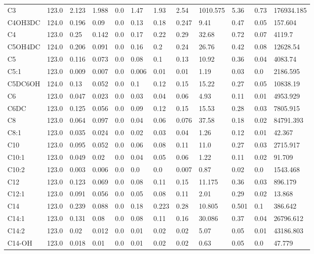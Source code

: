 \begin{tabular}{llllllllllll}
C3 & 123.0 & 2.123 & 1.988 & 0.0 & 1.47 & 1.93 & 2.54 & 1010.575 & 5.36 & 0.73 & 176934.185 \\
C4OH\C3DC & 124.0 & 0.196 & 0.09 & 0.0 & 0.13 & 0.18 & 0.247 & 9.41 & 0.47 & 0.05 & 157.604 \\
C4 & 123.0 & 0.25 & 0.142 & 0.0 & 0.17 & 0.22 & 0.29 & 32.68 & 0.72 & 0.07 & 4119.7 \\
C5OH\C4DC & 124.0 & 0.206 & 0.091 & 0.0 & 0.16 & 0.2 & 0.24 & 26.76 & 0.42 & 0.08 & 12628.54 \\
C5 & 123.0 & 0.116 & 0.073 & 0.0 & 0.08 & 0.1 & 0.13 & 10.92 & 0.36 & 0.04 & 4083.74 \\
C5:1 & 123.0 & 0.009 & 0.007 & 0.0 & 0.006 & 0.01 & 0.01 & 1.19 & 0.03 & 0.0 & 2186.595 \\
C5DC\C6OH & 124.0 & 0.13 & 0.052 & 0.0 & 0.1 & 0.12 & 0.15 & 15.22 & 0.27 & 0.05 & 10838.19 \\
C6 & 123.0 & 0.047 & 0.023 & 0.0 & 0.03 & 0.04 & 0.06 & 4.93 & 0.11 & 0.01 & 4953.929 \\
C6DC & 123.0 & 0.125 & 0.056 & 0.0 & 0.09 & 0.12 & 0.15 & 15.53 & 0.28 & 0.03 & 7805.915 \\
C8 & 123.0 & 0.064 & 0.097 & 0.0 & 0.04 & 0.06 & 0.076 & 37.58 & 0.18 & 0.02 & 84791.393 \\
C8:1 & 123.0 & 0.035 & 0.024 & 0.0 & 0.02 & 0.03 & 0.04 & 1.26 & 0.12 & 0.01 & 42.367 \\
C10 & 123.0 & 0.095 & 0.052 & 0.0 & 0.06 & 0.08 & 0.11 & 11.0 & 0.27 & 0.03 & 2715.917 \\
C10:1 & 123.0 & 0.049 & 0.02 & 0.0 & 0.04 & 0.05 & 0.06 & 1.22 & 0.11 & 0.02 & 91.709 \\
C10:2 & 123.0 & 0.003 & 0.006 & 0.0 & 0.0 & 0.0 & 0.007 & 0.87 & 0.02 & 0.0 & 1543.468 \\
C12 & 123.0 & 0.123 & 0.069 & 0.0 & 0.08 & 0.11 & 0.15 & 11.175 & 0.36 & 0.03 & 896.179 \\
C12:1 & 123.0 & 0.091 & 0.056 & 0.0 & 0.05 & 0.08 & 0.11 & 2.01 & 0.29 & 0.02 & 13.868 \\
C14 & 123.0 & 0.239 & 0.088 & 0.0 & 0.18 & 0.223 & 0.28 & 10.805 & 0.501 & 0.1 & 386.642 \\
C14:1 & 123.0 & 0.131 & 0.08 & 0.0 & 0.08 & 0.11 & 0.16 & 30.086 & 0.37 & 0.04 & 26796.612 \\
C14:2 & 123.0 & 0.02 & 0.012 & 0.0 & 0.01 & 0.02 & 0.02 & 5.07 & 0.05 & 0.01 & 43186.803 \\
C14-OH & 123.0 & 0.018 & 0.01 & 0.0 & 0.01 & 0.02 & 0.02 & 0.63 & 0.05 & 0.0 & 47.779 \\

\end{tabular}
